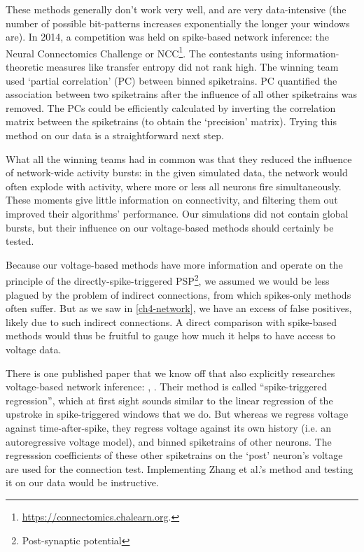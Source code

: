 These methods generally don't work very well\cite{Das2020SystematicErrorsConnectivity}, and are very data-intensive (the number of possible bit-patterns increases exponentially the longer your windows are). In 2014, a competition was held on spike-based network inference: the Neural Connectomics Challenge or NCC\cite{Guyon2014DesignFirstNeuronal,Orlandi2017FirstConnectomicsChallenge}\footnote{
    \url{https://connectomics.chalearn.org}.
}.
The contestants using information-theoretic measures like transfer entropy did not rank high.
The winning team used `partial correlation' (PC) between binned spiketrains.\cite{Sutera2017SimpleConnectomeInference}
PC quantified the association between two spiketrains after the influence of all other spiketrains was removed. The PCs could be efficiently calculated by inverting the correlation matrix between the spiketrains (to obtain the `precision' matrix).
Trying this method on our data is a straightforward next step.

What all the winning teams had in common was that they reduced the influence of network-wide activity bursts: in the given simulated data, the network would often explode with activity, where more or less all neurons fire simultaneously. These moments give little information on connectivity, and filtering them out improved their algorithms' performance.
Our simulations did not contain global bursts, but their influence on our voltage-based methods should certainly be tested.

Because our voltage-based methods have more information and operate on the principle of the directly-spike-triggered PSP\footnote{Post-synaptic potential}, we assumed we would be less plagued by the problem of indirect connections, from which spikes-only methods often suffer. But as we saw in \cref{ch4-network}, we have an excess of false positives, likely  due to such indirect connections. A direct comparison with spike-based methods would thus be fruitful to gauge how much it helps to have access to voltage data.

There is one published paper that we know off that also explicitly researches voltage-based network inference: , \cite{Zhang2017SpikeTriggeredRegressionSynaptic}.
Their method is called ``spike-triggered regression'', which at first sight sounds similar to the linear regression of the upstroke in spike-triggered windows that we do. But whereas we regress voltage against time-after-spike, they regress voltage against its own history (i.e. an autoregressive voltage model), and binned spiketrains of other neurons.
The regresssion coefficients of these other spiketrains on the `post' neuron's voltage are used for the connection test.
Implementing Zhang et al.'s method and testing it on our data would be instructive.


